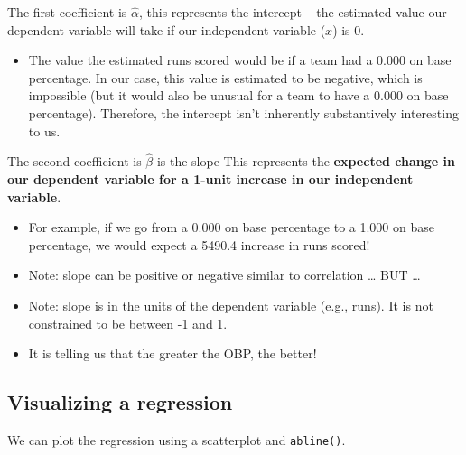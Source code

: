 \documentclass[
  letterpaper,
  DIV=11,
  numbers=noendperiod]{scrreprt}
\newenvironment{Shaded}{\begin{snugshade}}{\end{snugshade}}
\newcommand{\AttributeTok}[1]{\textcolor[rgb]{0.40,0.45,0.13}{#1}}
\newcommand{\CommentTok}[1]{\textcolor[rgb]{0.37,0.37,0.37}{#1}}
\newcommand{\DecValTok}[1]{\textcolor[rgb]{0.68,0.00,0.00}{#1}}
\newcommand{\DocumentationTok}[1]{\textcolor[rgb]{0.37,0.37,0.37}{\textit{#1}}}
\newcommand{\FunctionTok}[1]{\textcolor[rgb]{0.28,0.35,0.67}{#1}}
\newcommand{\NormalTok}[1]{\textcolor[rgb]{0.00,0.23,0.31}{#1}}
\newcommand{\SpecialCharTok}[1]{\textcolor[rgb]{0.37,0.37,0.37}{#1}}
\newcommand{\StringTok}[1]{\textcolor[rgb]{0.13,0.47,0.30}{#1}}
\providecommand{\tightlist}{%
  \setlength{\itemsep}{0pt}\setlength{\parskip}{0pt}}\usepackage{longtable,booktabs,array}
\begin{document}
The first coefficient is \(\hat \alpha\), this represents the intercept
-- the estimated value our dependent variable will take if our
independent variable (\(x\)) is 0.

\begin{itemize}
\tightlist
\item
  The value the estimated runs scored would be if a team had a 0.000 on
  base percentage. In our case, this value is estimated to be negative,
  which is impossible (but it would also be unusual for a team to have a
  0.000 on base percentage). Therefore, the intercept isn't inherently
  substantively interesting to us.
\end{itemize}

The second coefficient is \(\hat \beta\) is the slope This represents
the \textbf{expected change in our dependent variable for a 1-unit
increase in our independent variable}.

\begin{itemize}
\tightlist
\item
  For example, if we go from a 0.000 on base percentage to a 1.000 on
  base percentage, we would expect a 5490.4 increase in runs scored!
\item
  Note: slope can be positive or negative similar to correlation
  \ldots{} BUT \ldots{}
\item
  Note: slope is in the units of the dependent variable (e.g., runs). It
  is not constrained to be between -1 and 1.
\item
  It is telling us that the greater the OBP, the better!
\end{itemize}

\hypertarget{visualizing-a-regression}{%
\subsection{Visualizing a regression}\label{visualizing-a-regression}}

We can plot the regression using a scatterplot and \texttt{abline()}.

\begin{Shaded}
\end{Shaded}
\end{document}
